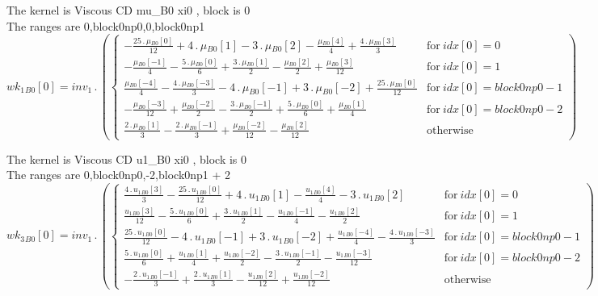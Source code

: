 \documentclass{article}
\begin{document}
\noindent The kernel is Viscous CD mu_B0 xi0 , block is 0\\\noindent The ranges are 0,block0np0,0,block0np1\\\begin{dmath}{wk_{1}{_{B0}}}[{0}] = inv_1 \,.\, \left(\begin{cases} - \frac{25 \,.\, {\mu{_{B0}}}[{0}]}{12} + 4 \,.\, {\mu{_{B0}}}[{1}] - 3 \,.\, {\mu{_{B0}}}[{2}] - \frac{{\mu{_{B0}}}[{4}]}{4} + \frac{4 \,.\, {\mu{_{B0}}}[{3}]}{3} & \text{for}\: 
{idx}[{0}] = 0 \\- \frac{{\mu{_{B0}}}[{-1}]}{4} - \frac{5 \,.\, {\mu{_{B0}}}[{0}]}{6} + \frac{3 \,.\, {\mu{_{B0}}}[{1}]}{2} - \frac{{\mu{_{B0}}}[{2}]}{2} + \frac{{\mu{_{B0}}}[{3}]}{12} & \text{for}\: {idx}[{0}] = 1 \\\frac{{\mu{_{B0}}}[{-4}]}{4} - 
\frac{4 \,.\, {\mu{_{B0}}}[{-3}]}{3} - 4 \,.\, {\mu{_{B0}}}[{-1}] + 3 \,.\, {\mu{_{B0}}}[{-2}] + \frac{25 \,.\, {\mu{_{B0}}}[{0}]}{12} & \text{for}\: {idx}[{0}] = block0np0 - 1 \\- \frac{{\mu{_{B0}}}[{-3}]}{12} + \frac{{\mu{_{B0}}}[{-2}]}{2} - 
\frac{3 \,.\, {\mu{_{B0}}}[{-1}]}{2} + \frac{5 \,.\, {\mu{_{B0}}}[{0}]}{6} + \frac{{\mu{_{B0}}}[{1}]}{4} & \text{for}\: {idx}[{0}] = block0np0 - 2 \\\frac{2 \,.\, {\mu{_{B0}}}[{1}]}{3} - \frac{2 \,.\, {\mu{_{B0}}}[{-1}]}{3} + 
\frac{{\mu{_{B0}}}[{-2}]}{12} - \frac{{\mu{_{B0}}}[{2}]}{12} & \text{otherwise} \end{cases}\right)\end{dmath}

\noindent The kernel is Viscous CD u1_B0 xi0 , block is 0\\\noindent The ranges are 0,block0np0,-2,block0np1 + 2\\\begin{dmath}{wk_{3}{_{B0}}}[{0}] = inv_1 \,.\, \left(\begin{cases} \frac{4 \,.\, {u_{1}{_{B0}}}[{3}]}{3} - \frac{25 \,.\, {u_{1}{_{B0}}}[{0}]}{12} + 4 \,.\, {u_{1}{_{B0}}}[{1}] - \frac{{u_{1}{_{B0}}}[{4}]}{4} - 3 \,.\, {u_{1}{_{B0}}}[{2}] & 
\text{for}\: {idx}[{0}] = 0 \\\frac{{u_{1}{_{B0}}}[{3}]}{12} - \frac{5 \,.\, {u_{1}{_{B0}}}[{0}]}{6} + \frac{3 \,.\, {u_{1}{_{B0}}}[{1}]}{2} - \frac{{u_{1}{_{B0}}}[{-1}]}{4} - \frac{{u_{1}{_{B0}}}[{2}]}{2} & \text{for}\: {idx}[{0}] = 1 \\\frac{25 
\,.\, {u_{1}{_{B0}}}[{0}]}{12} - 4 \,.\, {u_{1}{_{B0}}}[{-1}] + 3 \,.\, {u_{1}{_{B0}}}[{-2}] + \frac{{u_{1}{_{B0}}}[{-4}]}{4} - \frac{4 \,.\, {u_{1}{_{B0}}}[{-3}]}{3} & \text{for}\: {idx}[{0}] = block0np0 - 1 \\\frac{5 \,.\, {u_{1}{_{B0}}}[{0}]}{6} + 
\frac{{u_{1}{_{B0}}}[{1}]}{4} + \frac{{u_{1}{_{B0}}}[{-2}]}{2} - \frac{3 \,.\, {u_{1}{_{B0}}}[{-1}]}{2} - \frac{{u_{1}{_{B0}}}[{-3}]}{12} & \text{for}\: {idx}[{0}] = block0np0 - 2 \\- \frac{2 \,.\, {u_{1}{_{B0}}}[{-1}]}{3} + \frac{2 \,.\, 
{u_{1}{_{B0}}}[{1}]}{3} - \frac{{u_{1}{_{B0}}}[{2}]}{12} + \frac{{u_{1}{_{B0}}}[{-2}]}{12} & \text{otherwise} \end{cases}\right)\end{dmath}
\end{document}
